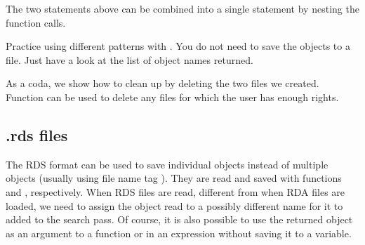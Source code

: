 \documentclass[krantz2]{krantz}\usepackage{knitr}
\begin{document}
The two statements above can be combined into a single statement by nesting the function calls.

\begin{knitrout}\footnotesize
{}\color{fgcolor}\begin{kframe}
\begin{alltt}
\hlstd{(} \hlstd{=} \hlstd{(} \hlstd{=} \hlstd{),}  \hlstd{=} \hlstd{)}
\end{alltt}
\end{kframe}
\end{knitrout}

\begin{playground}
Practice using different patterns with . You do not need to save the objects to a file. Just have a look at the list of object names returned.
\end{playground}

As a coda, we show how to clean up by deleting the two files we created. Function  can be used to delete any files for which the user has enough rights.

\begin{knitrout}\footnotesize
{}\color{fgcolor}\begin{kframe}
\begin{alltt}
\hlstd{(}\hlstd{(}\hlstd{,} \hlstd{))}
\end{alltt}
\end{kframe}
\end{knitrout}

\subsection{.rds files}\label{sec:data:rds}

The RDS format can be used to save individual objects instead of multiple objects (usually using file name tag ). They are read and saved with functions  and , respectively.
When RDS files are read, different from when RDA files are loaded, we need to assign the object read to a possibly different name for it to added to the search pass. Of course, it is also possible to use the returned object as an argument to a function or in an expression without saving it to a variable.
\end{document}
